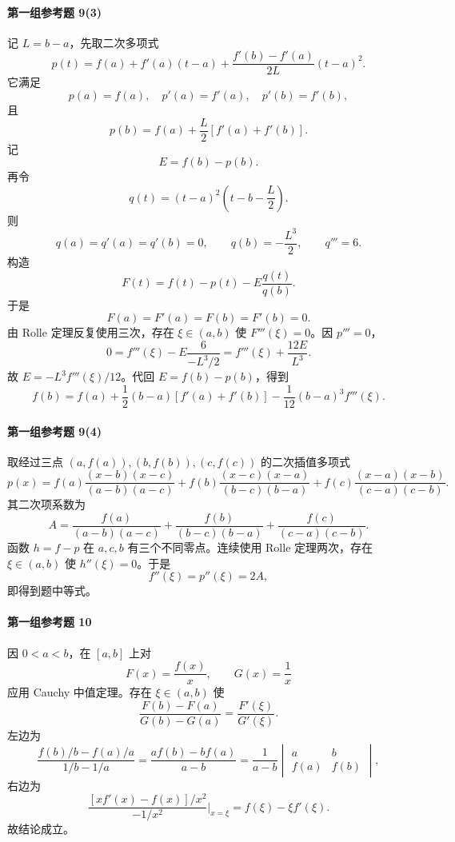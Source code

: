 \paragraph{第一组参考题 9(3)}
\begin{xsolution}
记 $L=b-a$，先取二次多项式
\[
  p(t)=f(a)+f'(a)(t-a)
  +\frac{f'(b)-f'(a)}{2L}(t-a)^2.
\]
它满足
\[
  p(a)=f(a),\quad p'(a)=f'(a),\quad p'(b)=f'(b),
\]
且
\[
  p(b)=f(a)+\frac L2[f'(a)+f'(b)].
\]
记
\[
  E=f(b)-p(b).
\]
再令
\[
  q(t)=(t-a)^2\left(t-b-\frac L2\right).
\]
则
\[
  q(a)=q'(a)=q'(b)=0,
  \qquad q(b)=-\frac{L^3}{2},
  \qquad q'''=6.
\]
构造
\[
  F(t)=f(t)-p(t)-E\frac{q(t)}{q(b)}.
\]
于是
\[
  F(a)=F'(a)=F(b)=F'(b)=0.
\]
由 Rolle 定理反复使用三次，存在 $\xi\in(a,b)$ 使 $F'''(\xi)=0$。因 $p'''=0$，
\[
  0=f'''(\xi)-E\frac{6}{-L^3/2}
  =f'''(\xi)+\frac{12E}{L^3}.
\]
故 $E=-L^3f'''(\xi)/12$。代回 $E=f(b)-p(b)$，得到
\[
  f(b)=f(a)+\frac12(b-a)[f'(a)+f'(b)]
  -\frac1{12}(b-a)^3f'''(\xi).
\]
\end{xsolution}

\paragraph{第一组参考题 9(4)}
\begin{xsolution}
取经过三点 $(a,f(a)),(b,f(b)),(c,f(c))$ 的二次插值多项式
\[
  p(x)=f(a)\frac{(x-b)(x-c)}{(a-b)(a-c)}
  +f(b)\frac{(x-c)(x-a)}{(b-c)(b-a)}
  +f(c)\frac{(x-a)(x-b)}{(c-a)(c-b)}.
\]
其二次项系数为
\[
  A=\frac{f(a)}{(a-b)(a-c)}
   +\frac{f(b)}{(b-c)(b-a)}
   +\frac{f(c)}{(c-a)(c-b)}.
\]
函数 $h=f-p$ 在 $a,c,b$ 有三个不同零点。连续使用 Rolle 定理两次，存在 $\xi\in(a,b)$ 使 $h''(\xi)=0$。于是
\[
  f''(\xi)=p''(\xi)=2A,
\]
即得到题中等式。
\end{xsolution}

\paragraph{第一组参考题 10}
\begin{xsolution}
因 $0<a<b$，在 $[a,b]$ 上对
\[
  F(x)=\frac{f(x)}x,
  \qquad
  G(x)=\frac1x
\]
应用 Cauchy 中值定理。存在 $\xi\in(a,b)$ 使
\[
  \frac{F(b)-F(a)}{G(b)-G(a)}
  =\frac{F'(\xi)}{G'(\xi)}.
\]
左边为
\[
  \frac{f(b)/b-f(a)/a}{1/b-1/a}
  =\frac{af(b)-bf(a)}{a-b}
  =\frac1{a-b}
  \begin{vmatrix}a&b\\ f(a)&f(b)\end{vmatrix},
\]
右边为
\[
  \frac{[xf'(x)-f(x)]/x^2}{-1/x^2}\Big|_{x=\xi}
  =f(\xi)-\xi f'(\xi).
\]
故结论成立。
\end{xsolution}

